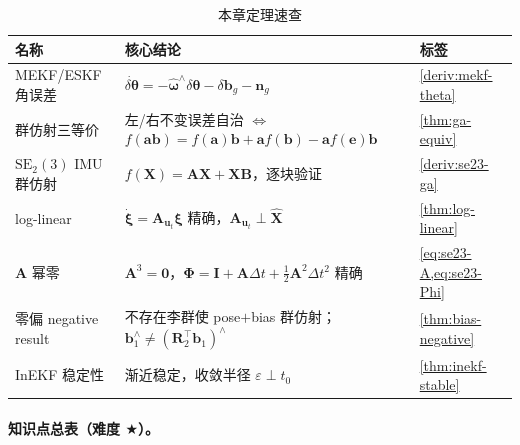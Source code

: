 \begin{table}[H]\centering\small
\caption{本章定理速查}
\begin{tabular}{lll}
\toprule
名称 & 核心结论 & 标签 \\
\midrule
MEKF/ESKF 角误差 & $\dot{\delta\boldsymbol{\theta}}=-\hat{\boldsymbol{\omega}}^\wedge\delta\boldsymbol{\theta}-\delta\mathbf{b}_g-\mathbf{n}_g$ & \cref{deriv:mekf-theta} \\
群仿射三等价 & 左/右不变误差自治 $\Leftrightarrow$ $f(\mathbf{a}\mathbf{b})=f(\mathbf{a})\mathbf{b}+\mathbf{a}f(\mathbf{b})-\mathbf{a}f(\mathbf{e})\mathbf{b}$ & \cref{thm:ga-equiv} \\
$\mathrm{SE}_2(3)$ IMU 群仿射 & $f(\mathbf{X})=\mathbf{A}\mathbf{X}+\mathbf{X}\mathbf{B}$，逐块验证 & \cref{deriv:se23-ga} \\
log-linear & $\dot{\boldsymbol{\xi}}=\mathbf{A}_{\mathbf{u}_t}\boldsymbol{\xi}$ 精确，$\mathbf{A}_{\mathbf{u}_t}\perp\hat{\mathbf{X}}$ & \cref{thm:log-linear} \\
$\mathbf{A}$ 幂零 & $\mathbf{A}^3=\mathbf{0}$，$\boldsymbol{\Phi}=\mathbf{I}+\mathbf{A}\Delta t+\tfrac12\mathbf{A}^2\Delta t^2$ 精确 & \cref{eq:se23-A,eq:se23-Phi} \\
零偏 negative result & 不存在李群使 pose$+$bias 群仿射；$\mathbf{b}_1^\wedge\neq(\mathbf{R}_2^\top\mathbf{b}_1)^\wedge$ & \cref{thm:bias-negative} \\
InEKF 稳定性 & 渐近稳定，收敛半径 $\varepsilon\perp t_0$ & \cref{thm:inekf-stable} \\
\bottomrule
\end{tabular}
\end{table}

\paragraph{知识点总表（难度 $\bigstar$）。}

